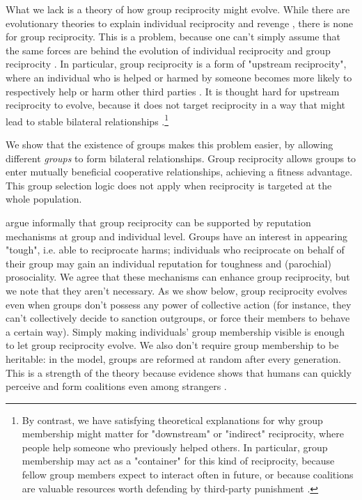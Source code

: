 \documentclass[12pt,a4paper]{article}
\begin{document}
What we lack is a theory of how group reciprocity might evolve. While there
are evolutionary theories to explain individual reciprocity and revenge
\citep{mccullough2013cognitive}, there is none for group reciprocity. This is
a problem, because one can't simply assume that the same forces are behind the evolution of 
individual reciprocity and group reciprocity 
\citep{pietraszewski2013elementary,mccullough2013putting}. 
In particular, group reciprocity is a form of "upstream reciprocity", where an individual
who is helped or harmed by someone becomes more likely to respectively help 
or harm other third parties \citep{boyd1989evolution}. It is thought hard 
for upstream reciprocity to evolve,
because it does not target reciprocity in a way that might lead to stable 
bilateral relationships \citep{nowak2007upstream}.\footnote{By contrast,
we have satisfying theoretical explanations for why group membership might
matter for "downstream" or "indirect" reciprocity, where people help someone
who previously helped others. In particular, group membership may act as a 
"container" for this kind of reciprocity, because fellow group members
expect to interact often in future, or because coalitions are valuable
resources worth defending by third-party punishment
\citep{yamagishi2000thegroup,romano2022direct,delton2017psychology}.} 
 
We show that the existence of groups makes this problem easier, by allowing 
different \emph{groups} to form bilateral relationships. Group reciprocity 
allows groups to enter mutually beneficial cooperative relationships, achieving 
a fitness advantage. This group selection logic does not apply when reciprocity is 
targeted at the whole population.

\citet{columbus2023parochial} argue informally that group reciprocity can
be supported by reputation mechanisms at group and individual level. Groups
have an interest in appearing "tough", i.e. able to reciprocate harms; individuals
who reciprocate on behalf of their group may gain an individual reputation for
toughness and (parochial) prosociality. We agree that these mechanisms can enhance
group reciprocity, but we note that they aren't necessary. As we show below,
group reciprocity evolves even when groups don't possess any power of collective 
action (for instance, they can't collectively decide to sanction outgroups, or 
force their members to behave a certain way). Simply making individuals' group 
membership visible is enough to let group reciprocity evolve. We also don't require
group membership to be heritable: in the model, groups are reformed at random
after every generation. This is a strength of the theory because evidence shows 
that humans can quickly perceive and form coalitions even among strangers 
\citep{tajfel1971social,kurzban2001can,tooby2010groups}.
\end{document}
